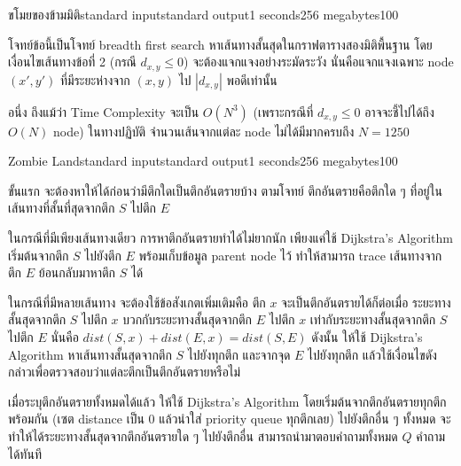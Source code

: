 \documentclass[11pt,a4paper]{article}
\begin{document}
\pagebreak

\begin{problem}{ขโมยของข้ามมิติ}{standard input}{standard output}{1 seconds}{256 megabytes}{100}

โจทย์ข้อนี้เป็นโจทย์ breadth first search หาเส้นทางสั้นสุดในกราฟตารางสองมิติพื้นฐาน โดยเงื่อนไขเส้นทางข้อที่ 2 (กรณี $d_{x,y} \leq 0$) จะต้องแจกแจงอย่างระมัดระวัง นั่นคือแจกแจงเฉพาะ node $(x',y')$ ที่มีระยะห่างจาก $(x,y)$ ไป $|d_{x,y}|$ พอดีเท่านั้น

อนึ่ง ถึงแม้ว่า Time Complexity จะเป็น $O(N^3)$ (เพราะกรณีที่ $d_{x,y} \leq 0$ อาจจะชี้ไปได้ถึง $O(N)$ node) ในทางปฏิบัติ จำนวนเส้นจากแต่ละ node ไม่ได้มีมากครบถึง $N=1250$

\end{problem}

\pagebreak

\begin{problem}{Zombie Land}{standard input}{standard output}{1 seconds}{256 megabytes}{100}

ขั้นแรก จะต้องหาให้ได้ก่อนว่ามีตึกใดเป็นตึกอันตรายบ้าง ตามโจทย์ ตึกอันตรายคือตึกใด ๆ ที่อยู่ในเส้นทางที่สั้นที่สุดจากตึก $S$ ไปตึก $E$

ในกรณีที่มีเพียงเส้นทางเดียว การหาตึกอันตรายทำได้ไม่ยากนัก เพียงแค่ใช้ Dijkstra's Algorithm เริ่มต้นจากตึก $S$ ไปยังตึก $E$ พร้อมเก็บข้อมูล parent node ไว้ ทำให้สามารถ trace เส้นทางจากตึก $E$ ย้อนกลับมาหาตึก $S$ ได้

ในกรณีที่มีหลายเส้นทาง จะต้องใช้ข้อสังเกตเพิ่มเติมคือ ตึก $x$ จะเป็นตึกอันตรายได้ก็ต่อเมื่อ ระยะทางสั้นสุดจากตึก $S$ ไปตึก $x$ บวกกับระยะทางสั้นสุดจากตึก $E$ ไปตึก $x$ เท่ากับระยะทางสั้นสุดจากตึก $S$ ไปตึก $E$ นั่นคือ $dist(S,x)+dist(E,x) = dist(S,E)$ ดังนั้น ให้ใช้ Dijkstra's Algorithm หาเส้นทางสั้นสุดจากตึก $S$ ไปยังทุกตึก และจากจุด $E$ ไปยังทุกตึก แล้วใช้เงื่อนไขดังกล่าวเพื่อตรวจสอบว่าแต่ละตึกเป็นตึกอันตรายหรือไม่

เมื่อระบุตึกอันตรายทั้งหมดได้แล้ว ให้ใช้ Dijkstra's Algorithm โดยเริ่มต้นจากตึกอันตรายทุกตึกพร้อมกัน (เซต distance เป็น 0 แล้วนำใส่ priority queue ทุกตึกเลย) ไปยังตึกอื่น ๆ ทั้งหมด จะทำให้ได้ระยะทางสั้นสุดจากตึกอันตรายใด ๆ ไปยังตึกอื่น สามารถนำมาตอบคำถามทั้งหมด $Q$ คำถามได้ทันที

\end{problem}

\pagebreak
\end{document}
